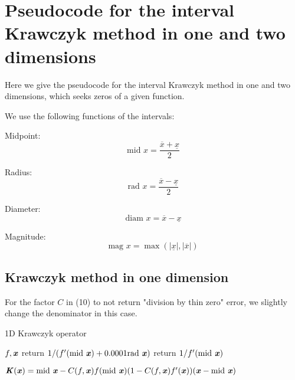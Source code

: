 \documentclass{article}
\begin{document}
\appendix
\section{Pseudocode for the interval Krawczyk method in one and two dimensions} 

Here we give the pseudocode for the interval Krawczyk method in one and two dimensions, which seeks zeros of a given function. 

We use the following functions of the intervals:

Midpoint: $$\text{mid } x = \frac{\overline{x} + \underline{x}}{2}$$

Radius: $$\text{rad } x = \frac{\overline{x} - \underline{x}}{2}$$

Diameter: $$\text{diam } x = \overline{x} - \underline{x}$$

Magnitude: $$\text{mag } x = \max(| \underline{x}|, | \overline{x} |)$$

\subsection{Krawczyk method in one dimension}

For the factor $C$ in (10) to not return "division by thin zero" error, we slightly change the denominator in this case.

\begin{algorithm}
\caption{1D Krawczyk operator}
\label{alg:K1D}
\begin{algorithmic}
 {$f, \textbf{\emph{x}}$}
\State       return $1/(f'(\text{mid } \textbf{\emph{x}}) + 0.0001 \text{rad } \textbf{\emph{x}})$
\Else
\State       return $1/f'(\text{mid } \textbf{\emph{x}})$
\EndIf
\EndFunction

$\textbf{\emph{K}} (\textbf{\emph{x}}) = \text{mid } \textbf{\emph{x}} - C(f, \textbf{\emph{x}}) f(\text{mid } \textbf{\emph{x}})(1 - C(f, \textbf{\emph{x}}) f'(\textbf{\emph{x}})) (\textbf{\emph{x}} - \text{mid } \textbf{\emph{x}})$



\end{algorithmic}
\end{algorithm}
\end{document}
